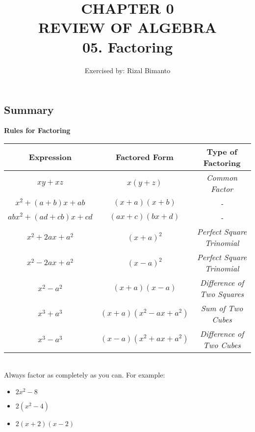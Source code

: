 \documentclass{article}
\title{CHAPTER 0\\
REVIEW OF ALGEBRA\\
05. Factoring
}
\author{Exercised by: Rizal Bimanto}
\date{}
\begin{document}
\maketitle

\begin{onehalfspace}
    \section{Summary}\par

    \textbf{Rules for Factoring}
    \\[1.5em]
        \begin{tabular}{|c|c|c|}
        \hline
        \textbf{Expression} & \textbf{Factored Form} & \textbf{Type of Factoring}\\
        \hline
        $xy + xz$ & $x(y + z)$ & \textit{Common Factor} \\
        $x^{2} + (a + b)x + ab$ & $(x + a)(x + b)$ & \textit{-} \\
        $abx^{2} + (ad + cb)x + cd$ & $(ax + c)(bx + d)$ & \textit{-} \\
        $x^{2} + 2ax + a^{2}$ & $(x + a)^{2}$ & \textit{Perfect Square Trinomial} \\
        $x^{2} - 2ax + a^{2}$ & $(x - a)^{2}$ & \textit{Perfect Square Trinomial} \\
        $x^{2} - a^{2}$ & $(x + a)(x - a)$ & \textit{Difference of Two Squares} \\
        $x^{3} + a^{3}$ & $(x + a)(x^{2} - ax + a^{2})$ & \textit{Sum of Two Cubes} \\
        $x^{3} - a^{3}$ & $(x - a)(x^{2} + ax + a^{2})$ & \textit{Difference of Two Cubes} \\
        \hline
        \end{tabular}
    \\[1.5em]
    Always factor as completely as you can.\newline
    For example:
    \begin{itemize}
        \item $2x^{2} - 8$
        \item $2(x^{2} - 4)$
        \item $2(x + 2)(x - 2)$
    \end{itemize}


\end{onehalfspace}
\end{document}
